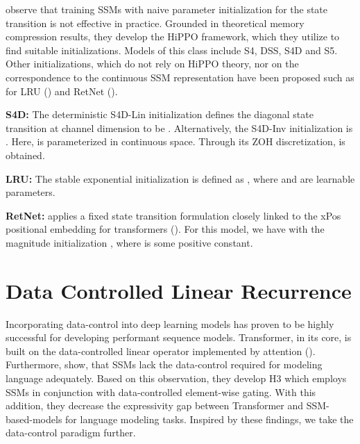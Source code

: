 \documentclass{article} \usepackage{iclr2024_conference,times}
\begin{document}
\cite{gu2022efficiently} observe that training SSMs with naive parameter initialization for the state transition  is not effective in practice. Grounded in theoretical memory compression results, they develop the HiPPO framework, which they utilize to find suitable initializations. Models of this class include S4, DSS, S4D and S5. Other initializations, which do not rely on HiPPO theory, nor on the correspondence to the continuous SSM representation have been proposed such as for LRU (\cite{orvieto2023resurrecting}) and RetNet (\cite{sun2023retentive}). 

\textbf{S4D:} The deterministic S4D-Lin initialization defines the diagonal state transition  at channel dimension  to be . Alternatively, the S4D-Inv initialization is . Here,  is parameterized in continuous space. Through its ZOH discretization,  is obtained.

\textbf{LRU:} The stable exponential initialization is defined as , where  and  are learnable parameters. 

\textbf{RetNet:} \cite{sun2023retentive} applies a fixed state transition formulation closely linked to the xPos positional embedding for transformers (\cite{sun2022lengthextrapolatable}). For this model, we have  with the magnitude initialization , where  is some positive constant.

\section{Data Controlled Linear Recurrence}
Incorporating data-control into deep learning models has proven to be highly successful for developing performant sequence models. Transformer, in its core, is built on the data-controlled linear operator implemented by attention (\cite{massaroli2021dissecting}). Furthermore, \cite{fu2023hungry} show, that SSMs lack the data-control required for modeling language adequately. Based on this observation, they develop H3 which employs SSMs in conjunction with data-controlled element-wise gating. With this addition, they decrease the expressivity gap between Transformer and SSM-based-models for language modeling tasks. Inspired by these findings, we take the data-control paradigm further. 
\end{document}
